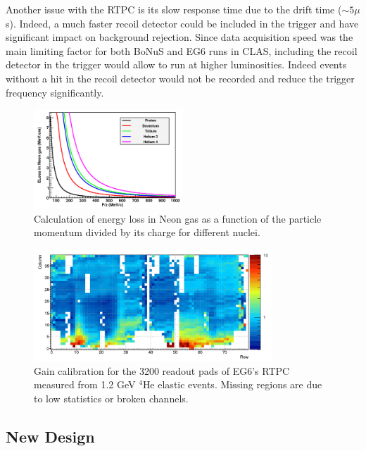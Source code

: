 Another issue with the RTPC is its slow response time due to the drift time 
($\sim 5\mu$s). Indeed, a much faster recoil detector could be included in the 
trigger and have significant impact on background rejection. Since data 
acquisition speed was the main limiting factor for both BoNuS and EG6 runs in 
CLAS, including the recoil detector in the trigger would allow to run at higher 
luminosities. Indeed events without a hit in the recoil detector would not be 
recorded and reduce the trigger frequency significantly.

\begin{figure}
  \begin{center}
    \includegraphics[angle=0, width=0.5\textwidth]{./../Detector/fig-chap2/pz}
    \caption{Calculation of energy loss in Neon gas as a function of the particle momentum divided by its charge for different nuclei. }
    \label{fig:eloss}
  \end{center}
\end{figure}

\begin{figure}
  \begin{center}
    \includegraphics[angle=0, width=0.8\textwidth]{./../Detector/fig-chap2/eg6_1stPassGains}
    \caption{Gain calibration for the 3200 readout pads of EG6's RTPC measured from 1.2 GeV $^4$He elastic events.  Missing regions are due to low statistics or broken channels.}
    \label{fig:EG6gains}
  \end{center}
\end{figure}

\subsection{New Design}

